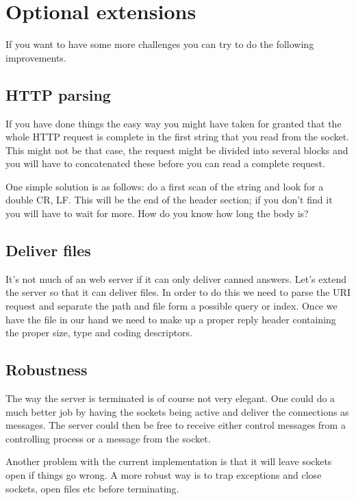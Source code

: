\documentclass[a4paper,11pt]{article}
\begin{document}

\section{Optional extensions}

If you want to have some more challenges you can try to do the
following improvements.

\subsection{HTTP parsing}
If you have done things the easy way you might have taken for granted
that the whole HTTP request is complete in the first string that you
read from the socket. This might not be that case, the request might be
divided into several blocks and you will have to concatenated these
before you can read a complete request. 

One simple solution is as follows: do a first scan of the string and
look for a double CR, LF. This will be the end of the header section;
if you don't find it you will have to wait for more. How do you know
how long the body is?

\subsection{Deliver files}
It's not much of an web server if it can only deliver canned
answers. Let's extend the server so that it can deliver files. In
order to do this we need to parse the URI request and separate the
path and file form a possible query or index. Once we have the file in
our hand we need to make up a proper reply header containing the
proper size, type and coding descriptors.

\subsection{Robustness}
The way the server is terminated is of course not very elegant. One
could do a much better job by having the sockets being active and
deliver the connections as messages. The server could then be free to
receive either control messages from a controlling process or a message
from the socket. 

Another problem with the current implementation is that it will leave
sockets open if things go wrong. A more robust way is to trap
exceptions and close sockets, open files etc before terminating. 
\end{document}
